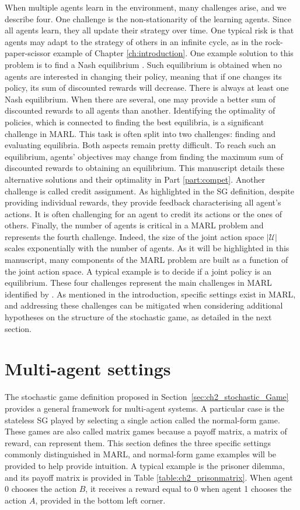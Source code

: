 When multiple agents learn in the environment, many challenges arise, and we describe four.
One challenge is the non-stationarity of the learning agents.
Since all agents learn, they all update their strategy over time.
One typical risk is that agents may adapt to the strategy of others in an infinite cycle, as in the rock-paper-scissor example of Chapter \ref{ch:introduction}.
One example solution to this problem is to find a Nash equilibrium \citep{nash1950equilibrium}.
Such equilibrium is obtained when no agents are interested in changing their policy, meaning that if one changes its policy, its sum of discounted rewards will decrease.
There is always at least one Nash equilibrium.
When there are several, one may provide a better sum of discounted rewards to all agents than another.
Identifying the optimality of policies, which is connected to finding the best equilibria, is a significant challenge in MARL.
This task is often split into two challenges: finding and evaluating equilibria.
Both aspects remain pretty difficult.
To reach such an equilibrium, agents' objectives may change from finding the maximum sum of discounted rewards to obtaining an equilibrium.
This manuscript details these alternative solutions and their optimality in Part \ref{part:compet}.
Another challenge is called credit assignment.
As highlighted in the SG definition, despite providing individual rewards, they provide feedback characterising all agent's actions.
It is often challenging for an agent to credit its actions or the ones of others.
Finally, the number of agents is critical in a MARL problem and represents the fourth challenge.
Indeed, the size of the joint action space $|\mathcal{U}|$ scales exponentially with the number of agents.
As it will be highlighted in this manuscript, many components of the MARL problem are built as a function of the joint action space.
A typical example is to decide if a joint policy is an equilibrium.
These four challenges represent the main challenges in MARL identified by \cite{marl-book}.
As mentioned in the introduction, specific settings exist in MARL, and addressing these challenges can be mitigated when considering additional hypotheses on the structure of the stochastic game, as detailed in the next section.

\section{Multi-agent settings} 
\label{sec:ch2_multi_agent_settings}
The stochastic game definition proposed in Section~\ref{sec:ch2_stochastic_Game} provides a general framework for multi-agent systems.
A particular case is the stateless SG played by selecting a single action called the normal-form game.
These games are also called matrix games because a payoff matrix, a matrix of reward, can represent them.
This section defines the three specific settings commonly distinguished in MARL, and normal-form game examples will be provided to help provide intuition.
A typical example is the prisoner dilemma, and its payoff matrix is provided in Table \ref{table:ch2_prisonmatrix}.
When agent 0 chooses the action $B$, it receives a reward equal to 0 when agent 1 chooses the action $A$, provided in the bottom left corner.

